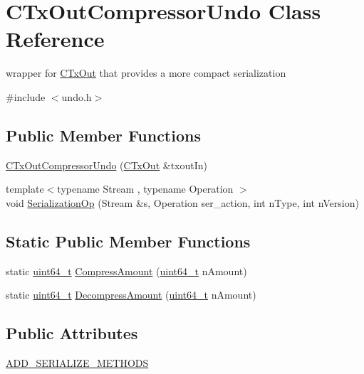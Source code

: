 \hypertarget{class_c_tx_out_compressor_undo}{}\section{C\+Tx\+Out\+Compressor\+Undo Class Reference}
\label{class_c_tx_out_compressor_undo}


wrapper for \hyperlink{class_c_tx_out}{C\+Tx\+Out} that provides a more compact serialization  




{\ttfamily \#include $<$undo.\+h$>$}

\subsection*{Public Member Functions}
\begin{DoxyCompactItemize}
\item 
\hyperlink{class_c_tx_out_compressor_undo_aa875928367c7add7f14d37f3094683f9}{C\+Tx\+Out\+Compressor\+Undo} (\hyperlink{class_c_tx_out}{C\+Tx\+Out} \&txout\+In)
\item 
{\footnotesize template$<$typename Stream , typename Operation $>$ }\\void \hyperlink{class_c_tx_out_compressor_undo_a8954471df1084f43cb8c379cacd8bd39}{Serialization\+Op} (Stream \&s, Operation ser\+\_\+action, int n\+Type, int n\+Version)
\end{DoxyCompactItemize}
\subsection*{Static Public Member Functions}
\begin{DoxyCompactItemize}
\item 
static \hyperlink{stdint_8h_aaa5d1cd013383c889537491c3cfd9aad}{uint64\+\_\+t} \hyperlink{class_c_tx_out_compressor_undo_addfc120954d0a04023ae55d01572abe4}{Compress\+Amount} (\hyperlink{stdint_8h_aaa5d1cd013383c889537491c3cfd9aad}{uint64\+\_\+t} n\+Amount)
\item 
static \hyperlink{stdint_8h_aaa5d1cd013383c889537491c3cfd9aad}{uint64\+\_\+t} \hyperlink{class_c_tx_out_compressor_undo_a5bf64824b37d0bdf57dbc1be1e7c8baf}{Decompress\+Amount} (\hyperlink{stdint_8h_aaa5d1cd013383c889537491c3cfd9aad}{uint64\+\_\+t} n\+Amount)
\end{DoxyCompactItemize}
\subsection*{Public Attributes}
\begin{DoxyCompactItemize}
\item 
\hyperlink{class_c_tx_out_compressor_undo_a8519d03067bf052756ad81e022c51c5f}{A\+D\+D\+\_\+\+S\+E\+R\+I\+A\+L\+I\+Z\+E\+\_\+\+M\+E\+T\+H\+O\+D\+S}
\end{DoxyCompactItemize}


